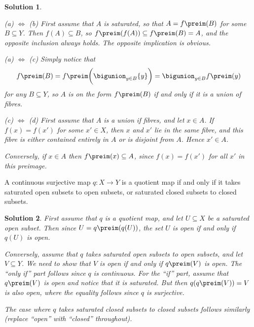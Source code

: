 \documentclass[article, a4paper, 11pt, oneside]{memoir}
\numberwithin{equation}{chapter}
\renewenvironment{exerciseframed}[1][]{%
    \setsepchar{.}%
    \readlist*\mylist{#1}%
    \def\smalllabel{\mylist[2].\mylist[3]}%
    \refstepcounter{exerciseframed}%
    \begin{exerciseframed*}[#1]%
    \label{ex:#1}%
}{%
    \end{exerciseframed*}%
}
\theoremstyle{nonumberplain}
\newtheorem{solution}{Solution}
\begin{document}
\begin{solution}
\begin{proofsec}
    \item[(a) $\Leftrightarrow$ (b)]
    First assume that $A$ is saturated, so that $A = f\preim(B)$ for some $B \subseteq Y$. Then $f(A) \subseteq B$, so $f\preim(f(A)) \subseteq f\preim(B) = A$, and the opposite inclusion always holds. The opposite implication is obvious.

    \item[(a) $\Leftrightarrow$ (c)]
    Simply notice that
    \begin{equation*}
        f\preim(B)
            = f\preim \biggl( \bigunion_{y \in B} \{y\} \biggr)
            = \bigunion_{y \in B} f\preim(y)
    \end{equation*}
    for any $B \subseteq Y$, so $A$ is on the form $f\preim(B)$ if and only if it is a union of fibres.

    \item[(c) $\Leftrightarrow$ (d)]
    First assume that $A$ is a union if fibres, and let $x \in A$. If $f(x) = f(x')$ for some $x' \in X$, then $x$ and $x'$ lie in the same fibre, and this fibre is either contained entirely in $A$ or is disjoint from $A$. Hence $x' \in A$.
    
    Conversely, if $x \in A$ then $f\preim(x) \subseteq A$, since $f(x) = f(x')$ for all $x'$ in this preimage.
\end{proofsec}
\end{solution}


\begin{exerciseframed}[3.61]
    A continuous surjective map $q \colon X \to Y$ is a quotient map if and only if it takes saturated open subsets to open subsets, or saturated closed subsets to closed subsets.
\end{exerciseframed}

\begin{solution}
    First assume that $q$ is a quotient map, and let $U \subseteq X$ be a saturated open subset. Then since $U = q\preim(q(U))$, the set $U$ is open if and only if $q(U)$ is open.

    Conversely, assume that $q$ takes saturated open subsets to open subsets, and let $V \subseteq Y$. We need to show that $V$ is open if and only if $q\preim(V)$ is open. The \enquote{only if} part follows since $q$ is continuous. For the \enquote{if} part, assume that $q\preim(V)$ is open and notice that it is saturated. But then $q(q\preim(V)) = V$ is also open, where the equality follows since $q$ is surjective.

    The case where $q$ takes saturated closed subsets to closed subsets follows similarly (replace \enquote{open} with \enquote{closed} throughout).
\end{solution}
\end{document}
